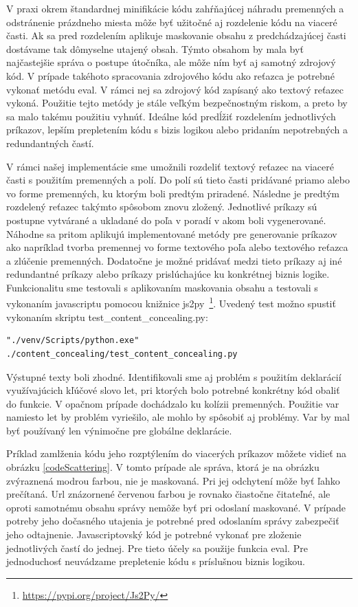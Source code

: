 \documentclass[conference, 11pt,slovak,a4paper,twoside]{IEEEtran}
\begin{document}
V praxi okrem štandardnej minifikácie kódu zahŕňajúcej náhradu premenných a odstránenie prázdneho miesta môže byť užitočné aj rozdelenie kódu na viaceré časti. Ak sa pred rozdelením aplikuje maskovanie obsahu z predchádzajúcej časti dostávame tak dômyselne utajený obsah. Týmto obsahom by mala byť najčastejšie správa o postupe útočníka, ale môže ním byť aj samotný zdrojový kód. V prípade takéhoto spracovania zdrojového kódu ako reťazca je potrebné vykonať metódu eval. V rámci nej sa zdrojový kód zapísaný ako textový reťazec vykoná. Použitie tejto metódy je stále veľkým bezpečnostným riskom, a preto by sa malo takému použitiu vyhnúť. Ideálne kód predĺžiť rozdelením jednotlivých príkazov, lepším prepletením kódu s bizis logikou alebo pridaním nepotrebných a redundantných častí.

V rámci našej implementácie sme umožnili rozdeliť textový reťazec na viaceré časti s použitím premenných a polí. Do polí sú tieto časti pridávané priamo alebo vo forme premenných, ku ktorým boli predtým priradené. Následne je predtým rozdelený reťazec takýmto spôsobom znovu zložený. Jednotlivé príkazy sú postupne vytvárané a ukladané do poľa v poradí v akom boli vygenerované. Náhodne sa pritom aplikujú implementované metódy pre generovanie príkazov ako napríklad tvorba premennej vo forme textového poľa alebo textového reťazca a zlúčenie premenných. Dodatočne je možné pridávať medzi tieto príkazy aj iné redundantné príkazy alebo príkazy prislúchajúce ku konkrétnej biznis logike. Funkcionalitu sme testovali s aplikovaním maskovania obsahu a testovali s vykonaním javascriptu pomocou knižnice js2py~\footnote{\url{https://pypi.org/project/Js2Py/}}. Uvedený test možno spustiť vykonaním skriptu test\_content\_concealing.py:

\begin{lstlisting}
"./venv/Scripts/python.exe" ./content_concealing/test_content_concealing.py
\end{lstlisting}


Výstupné texty boli zhodné. Identifikovali sme aj problém s použitím deklarácií využívajúcich kľúčové slovo let, pri ktorých bolo potrebné konkrétny kód obaliť do funkcie. V opačnom prípade dochádzalo ku kolízii premenných. Použitie var namiesto let by problém vyriešilo, ale mohlo by spôsobiť aj problémy. Var by mal byť používaný len výnimočne pre globálne deklarácie. 

Príklad zamlženia kódu jeho rozptýlením do viacerých príkazov môžete vidieť na obrázku \ref{codeScattering}. V tomto prípade ale správa, ktorá je na obrázku zvýraznená modrou farbou, nie je maskovaná. Pri jej odchytení môže byť ľahko prečítaná. Url znázornené červenou farbou je rovnako čiastočne čitateľné, ale oproti samotnému obsahu správy nemôže byť pri odoslaní maskované. V prípade potreby jeho dočasného utajenia je potrebné pred odoslaním správy zabezpečiť jeho odtajnenie. Javascriptovský kód je potrebné vykonať pre zloženie jednotlivých častí do jednej. Pre tieto účely sa použije funkcia eval. Pre jednoduchosť neuvádzame prepletenie kódu s príslušnou biznis logikou.
\end{document}

